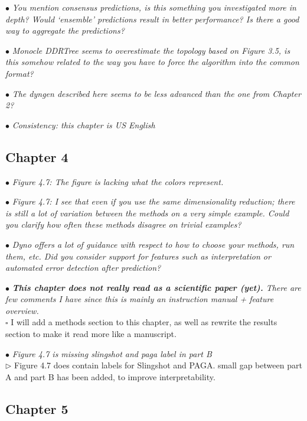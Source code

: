 \documentclass[10pt]{article}
\newcommand{\todo}{$\square$}
\newcommand{\done}{\makebox[0pt][l]{$\square$}\raisebox{.15ex}{\hspace{0.1em}$\checkmark$}}%
\newcommand{\exam}[2][\  ]{\hspace{0pt}\marginpar{\color{myred}#1}$\bullet$ \textit{#2}}
\newcommand{\imp}[1]{\textbf{#1}}
\newcommand{\answ}[1]{{\color{myblue} $\triangleright$ #1}}
\newcommand{\task}[2][\todo]{{\color{myblue} #1 #2}}
\newcommand{\bigexclaim}{\raisebox{-0.1em}{\BigTriangleUp}\hspace{-0.32em}\llap{\small\textbf{!}}\hspace{0.32em}}
\newcommand{\tagimp}{\bigexclaim}
\newcommand{\tagtime}{{\Large $\hourglass$}}
\begin{document}
\exam{You mention consensus predictions, is this something you investigated more
		in depth? Would ‘ensemble’ predictions result in better performance? Is there
		a good way to aggregate the predictions?}

\exam{Monocle DDRTree seems to overestimate the topology based on Figure 3.5, is
	this somehow related to the way you have to force the algorithm into the
	common format?}

\exam{The dyngen described here seems to be less advanced than the one from
		Chapter 2?}

\exam[\tagtime]{Consistency: this chapter is US English}


\subsection{Chapter 4}

\exam{Figure 4.7: The figure is lacking what the colors represent.}

\exam{Figure 4.7: I see that even if you use the same dimensionality
	reduction; there is still a lot of variation between the methods on a very simple
	example. Could you clarify
	how often these methods disagree on trivial examples?}

\exam{Dyno offers a lot of
	guidance with respect to how to choose your methods, run them, etc. Did you
	consider support for features such as interpretation or automated error
	detection after prediction?}

\exam[\tagimp \tagtime]{\imp{This chapter does not really read as a scientific paper (yet).} There are few
	comments I have since this is mainly an instruction manual + feature overview.} \\
\task{I will add a methods section to this chapter, as well as rewrite the results section to make it read more like a manuscript.}

\exam{Figure 4.7 is missing slingshot and paga label in part B} \\
\answ{Figure 4.7 does contain labels for Slingshot and PAGA.}
\task[\done]{ small gap between part A and part B has been added, to improve interpretability.}


\subsection{Chapter 5}
\end{document}
